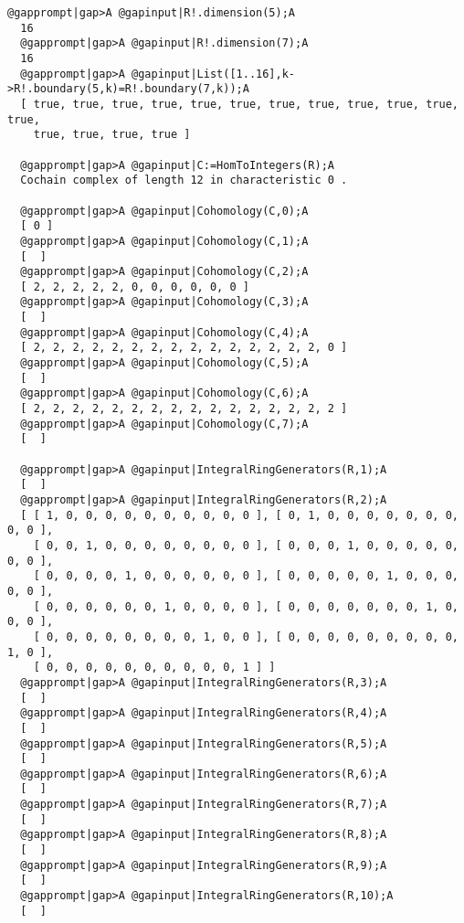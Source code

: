 \documentclass[a4paper,11pt]{report}
\begin{document}
{{\begin{Verbatim}[commandchars=@|A,fontsize=\small,frame=single,label=Example]
  @gapprompt|gap>A @gapinput|R!.dimension(5);A
  16
  @gapprompt|gap>A @gapinput|R!.dimension(7);A
  16
  @gapprompt|gap>A @gapinput|List([1..16],k->R!.boundary(5,k)=R!.boundary(7,k));A
  [ true, true, true, true, true, true, true, true, true, true, true, true, 
    true, true, true, true ]
  
  @gapprompt|gap>A @gapinput|C:=HomToIntegers(R);A
  Cochain complex of length 12 in characteristic 0 . 
  
  @gapprompt|gap>A @gapinput|Cohomology(C,0);A
  [ 0 ]
  @gapprompt|gap>A @gapinput|Cohomology(C,1);A
  [  ]
  @gapprompt|gap>A @gapinput|Cohomology(C,2);A
  [ 2, 2, 2, 2, 2, 0, 0, 0, 0, 0, 0 ]
  @gapprompt|gap>A @gapinput|Cohomology(C,3);A
  [  ]
  @gapprompt|gap>A @gapinput|Cohomology(C,4);A
  [ 2, 2, 2, 2, 2, 2, 2, 2, 2, 2, 2, 2, 2, 2, 2, 0 ]
  @gapprompt|gap>A @gapinput|Cohomology(C,5);A
  [  ]
  @gapprompt|gap>A @gapinput|Cohomology(C,6);A
  [ 2, 2, 2, 2, 2, 2, 2, 2, 2, 2, 2, 2, 2, 2, 2, 2 ]
  @gapprompt|gap>A @gapinput|Cohomology(C,7);A
  [  ]
  
  @gapprompt|gap>A @gapinput|IntegralRingGenerators(R,1);A
  [  ]
  @gapprompt|gap>A @gapinput|IntegralRingGenerators(R,2);A
  [ [ 1, 0, 0, 0, 0, 0, 0, 0, 0, 0, 0 ], [ 0, 1, 0, 0, 0, 0, 0, 0, 0, 0, 0 ], 
    [ 0, 0, 1, 0, 0, 0, 0, 0, 0, 0, 0 ], [ 0, 0, 0, 1, 0, 0, 0, 0, 0, 0, 0 ], 
    [ 0, 0, 0, 0, 1, 0, 0, 0, 0, 0, 0 ], [ 0, 0, 0, 0, 0, 1, 0, 0, 0, 0, 0 ], 
    [ 0, 0, 0, 0, 0, 0, 1, 0, 0, 0, 0 ], [ 0, 0, 0, 0, 0, 0, 0, 1, 0, 0, 0 ], 
    [ 0, 0, 0, 0, 0, 0, 0, 0, 1, 0, 0 ], [ 0, 0, 0, 0, 0, 0, 0, 0, 0, 1, 0 ], 
    [ 0, 0, 0, 0, 0, 0, 0, 0, 0, 0, 1 ] ]
  @gapprompt|gap>A @gapinput|IntegralRingGenerators(R,3);A
  [  ]
  @gapprompt|gap>A @gapinput|IntegralRingGenerators(R,4);A
  [  ]
  @gapprompt|gap>A @gapinput|IntegralRingGenerators(R,5);A
  [  ]
  @gapprompt|gap>A @gapinput|IntegralRingGenerators(R,6);A
  [  ]
  @gapprompt|gap>A @gapinput|IntegralRingGenerators(R,7);A
  [  ]
  @gapprompt|gap>A @gapinput|IntegralRingGenerators(R,8);A
  [  ]
  @gapprompt|gap>A @gapinput|IntegralRingGenerators(R,9);A
  [  ]
  @gapprompt|gap>A @gapinput|IntegralRingGenerators(R,10);A
  [  ]
  
  
\end{Verbatim}
 

}}
\end{document}
